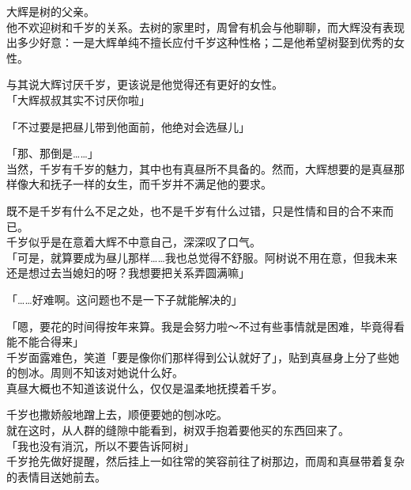 大辉是树的父亲。\\

他不欢迎树和千岁的关系。去树的家里时，周曾有机会与他聊聊，而大辉没有表现出多少好意：一是大辉单纯不擅长应付千岁这种性格；二是他希望树娶到优秀的女性。

与其说大辉讨厌千岁，更该说是他觉得还有更好的女性。\\

「大辉叔叔其实不讨厌你啦」

「不过要是把昼儿带到他面前，他绝对会选昼儿」

「那、那倒是……」\\

当然，千岁有千岁的魅力，其中也有真昼所不具备的。然而，大辉想要的是真昼那样像大和抚子一样的女生，而千岁并不满足他的要求。

既不是千岁有什么不足之处，也不是千岁有什么过错，只是性情和目的合不来而已。\\

千岁似乎是在意着大辉不中意自己，深深叹了口气。\\

「可是，就算要成为昼儿那样……我也总觉得不舒服。阿树说不用在意，但我未来还是想过去当媳妇的呀？我想要把关系弄圆满嘛」

「……好难啊。这问题也不是一下子就能解决的」

「嗯，要花的时间得按年来算。我是会努力啦～不过有些事情就是困难，毕竟得看能不能合得来」\\

千岁面露难色，笑道「要是像你们那样得到公认就好了」，贴到真昼身上分了些她的刨冰。周则不知该对她说什么好。\\

真昼大概也不知道该说什么，仅仅是温柔地抚摸着千岁。

千岁也撒娇般地蹭上去，顺便要她的刨冰吃。\\

就在这时，从人群的缝隙中能看到，树双手抱着要他买的东西回来了。\\

「我也没有消沉，所以不要告诉阿树」\\

千岁抢先做好提醒，然后挂上一如往常的笑容前往了树那边，而周和真昼带着复杂的表情目送她前去。
